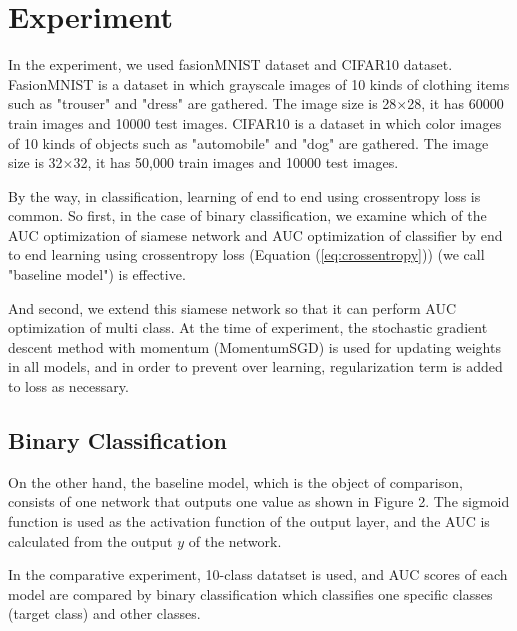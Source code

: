 \documentclass[twocolumn,10pt]{article}
\begin{document}
\section{Experiment}
\thispagestyle{empty}

In the experiment, we used fasionMNIST dataset and CIFAR10 dataset.
FasionMNIST is a dataset in which grayscale images of 10 kinds of clothing items such as "trouser" and "dress" are gathered.
The image size is 28$\times$28, it has 60000 train images and 10000 test images.
CIFAR10 is a dataset in which color images of 10 kinds of objects such as "automobile" and "dog" are gathered.
The image size is 32$\times$32, it has 50,000 train images and 10000 test images.




By the way, in classification, learning of end to end using crossentropy loss is common.
So first, in the case of binary classification, we examine which of the AUC optimization of siamese network and AUC optimization of classifier by end to end learning using crossentropy loss (Equation (\ref{eq:crossentropy})) (we call "baseline model") is effective.


And second, we extend this siamese network so that it can perform AUC optimization of multi class. 
At the time of experiment, the stochastic gradient descent method with momentum (MomentumSGD) is used for updating weights in all models, and in  order  to  prevent  over  learning, regularization  term  is  added  to  loss  as  necessary.



\subsection{Binary Classification}

On the other hand, the baseline model, which is the object of comparison, consists of one network that outputs one value as shown in Figure 2.
The sigmoid function is used as the activation function of the output layer, and the AUC is calculated from the output $y$ of the network. \par
In the comparative experiment,  10-class datatset is used, and AUC scores of each model are compared by binary classification which classifies one specific classes (target class) and other classes.
\end{document}
